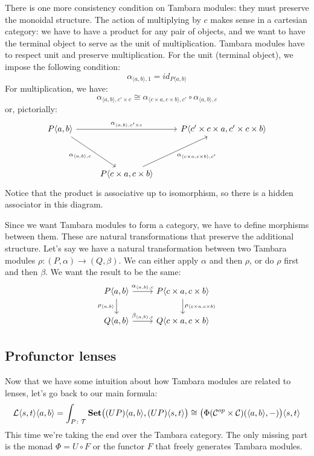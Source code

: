 \documentclass[DaoFP]{subfiles}
\begin{document}
There is one more consistency condition on Tambara modules: they must preserve the monoidal structure. The action of multiplying by $c$ makes sense in a cartesian category: we have to have a product for any pair of objects, and we want to have the terminal object to serve as the unit of multiplication. Tambara modules have to respect unit and preserve multiplication. For the unit (terminal object), we impose the following condition:
\[ \alpha_{\langle a, b \rangle, 1} = id _{P \langle a, b \rangle}\]
For multiplication, we have:
\[ \alpha_{\langle a, b \rangle, c' \times c} \cong  \alpha_{\langle c \times a, c \times b \rangle, c'} \circ  \alpha_{\langle a, b \rangle, c}\]
or, pictorially:
\[
 \begin{tikzcd}
 P \langle a, b \rangle
 \arrow[rr, "{\alpha_{\langle a, b \rangle, c' \times c } }"]
 \arrow[rdd, "{ \alpha_{\langle a, b \rangle, c}}"']
 &&
 P \langle c' \times c \times a, c' \times c \times b \rangle
 \\
 \\
 & P \langle c \times a, c \times b \rangle
  \arrow[ruu, "{\alpha_{\langle c \times a, c \times b \rangle, c'}}"']
\end{tikzcd}
\]
Notice that the product is associative up to isomorphism, so there is a hidden associator in this diagram.

Since we want Tambara modules to form a category, we have to define morphisms between them. These are natural transformations that preserve the additional structure. Let's say we have a natural transformation between two Tambara modules $\rho \colon (P, \alpha) \to (Q, \beta) $. We can either apply $\alpha$ and then $\rho$, or do $\rho$ first and then  $\beta$. We want the result to be the same:
\[
 \begin{tikzcd}
  P \langle a, b \rangle
 \arrow[d, "{ \rho_{\langle a, b \rangle}}"']
 \arrow[r, "{ \alpha_{\langle a, b \rangle, c}}"]
  &  P \langle c \times a, c \times b \rangle
  \arrow[d, "{ \rho_{\langle c \times a, c \times b \rangle}}"]
\\
   Q \langle a, b \rangle
 \arrow[r, "{ \beta_{\langle a, b \rangle, c}}"]
 &  Q \langle c \times a, c \times b \rangle
 \end{tikzcd}
\]


\subsection{Profunctor lenses}

Now that we have some intuition about how Tambara modules are related to lenses, let's go back to our main formula:
\[  \mathcal{L}\langle s, t\rangle \langle a, b \rangle =\int_{P \colon \mathcal{T}} \mathbf{Set} \big((U P) \langle a, b\rangle, (U P) \langle s, t\rangle \big) \cong \big( \Phi (\mathcal{C}^{op} \times \mathcal{C}) (\langle a, b\rangle ,-) \big) \langle s, t\rangle \]
This time we're taking the end over the Tambara category. The only missing part is the monad $\Phi = U \circ F$ or the functor $F$ that freely generates Tambara modules.
\end{document}
